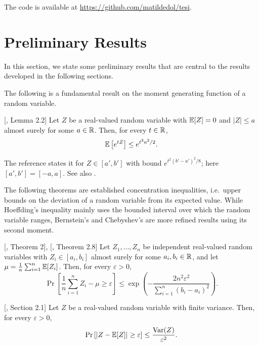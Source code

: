 \documentclass[reqno]{amsart}
\let\oldsection\section
\renewcommand{\section}{\clearpage\thispagestyle{plain}\oldsection}
\begin{document}
The code is available at \href{https://github.com/matildedol/tesi}{https://github.com/matildedol/tesi}.

\newpage
\section{Preliminary Results}\label{sec: prel}

In this section, we state some preliminary results that are central to the results developed in the following sections. 

The following is a fundamental result on the moment generating function of a random variable. 

\begin{theorem}\label{app: hoeffdinglemma} [\cite{boucheron2013concentration}, Lemma 2.2]
  Let $Z$ be a real-valued random variable with $\mathbb{E}[Z]=0$ and $\vert Z\vert\le a$ almost surely for some $a\in\mathbb{R}$. Then, for every $t\in\mathbb{R}$,
  \[
  \mathbb{E}\left[e^{tZ}\right] \le e^{t^2a^2/2}.
  \]
\end{theorem}
The reference states it for $Z\in[a',b']$ with bound $e^{t^2(b'-a')^2/8}$; here $[a',b']=[-a,a]$. See also \cite{hoeffding1963probability}.

The following theorems are established concentration inequalities, i.e.\ upper bounds on the deviation of a random variable from its expected value. While Hoeffding's inequality mainly uses the bounded interval over which the random variable ranges, Bernstein's and Chebyshev's are more refined results using its second moment. 

\begin{theorem}\label{app: hoeffding} [\cite{hoeffding1963probability}, Theorem 2], [\cite{boucheron2013concentration}, Theorem 2.8]
  Let $Z_1,\ldots,Z_n$ be independent real-valued random variables with $Z_i\in[a_i,b_i]$ almost surely for some $a_i,b_i\in\mathbb{R}$, and let $\mu = \frac1n\sum_{i=1}^n \mathbb{E}[Z_i]$. Then, for every $\varepsilon>0$,
  \[
  \Pr\left[\frac1n\sum_{i=1}^n Z_i - \mu \ge \varepsilon\right] \le \exp\left(-\frac{2n^2\varepsilon^2}{\sum_{i=1}^n (b_i-a_i)^2}\right).
  \]
\end{theorem}

\begin{theorem}\label{app: chebyshev} [\cite{boucheron2013concentration}, Section 2.1]
  Let $Z$ be a real-valued random variable with finite variance. Then, for every $\varepsilon>0$,
  \[
  \Pr\left[\vert Z - \mathbb{E}[Z]\vert \ge \varepsilon\right] \le \frac{\operatorname{Var}(Z)}{\varepsilon^2}.
  \]
\end{theorem}
\end{document}
